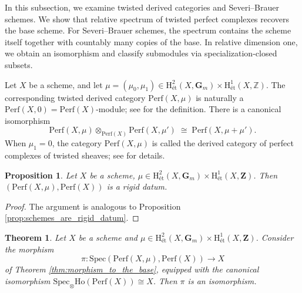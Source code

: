 \documentclass[11pt]{amsart}
\theoremstyle{definition}
\theoremstyle{plain}
\newtheorem{thm}[defn]{Theorem}
\newtheorem{prop}[defn]{Proposition}
\theoremstyle{remark}
\newcommand{\Ho}{\mathrm{Ho}}
\newcommand{\perf}{\mathrm{Perf}}
\newcommand{\Spec}{\mathrm{Spec}}
\newcommand{\oSpec}{\mathrm{Spec}_{\otimes}}
\newcommand{\etch}{\mathrm{H}_{\text{\'{e}t}}}
\numberwithin{equation}{section}
\begin{document}
In this subsection, we examine twisted derived categories and Severi--Brauer schemes. 
We show that relative spectrum of twisted perfect complexes recovers the base scheme. 
For Severi--Brauer schemes, the spectrum contains the scheme itself together with countably many copies of the base. 
In relative dimension one, we obtain an isomorphism and classify submodules via specialization-closed subsets.


Let \(X\) be a scheme, and let  
\(\mu = (\mu_0, \mu_1) \in \etch^2(X, \mathbf{G}_m) \times \etch^1(X, \mathbb{Z})\).  
The corresponding twisted derived category \(\perf(X, \mu)\) is naturally a \(\perf(X,0)=\perf(X)\)-module; see \cite{To2} for the definition.  
There is a canonical isomorphism
\[
\perf(X, \mu) \otimes_{\perf(X)} \perf(X, \mu') \;\cong\; \perf(X, \mu + \mu').
\]
When \(\mu_1=0\), the category \(\perf(X, \mu)\) is called the derived category of perfect complexes of twisted sheaves; see \cite{Ca} for details.



\begin{prop}
Let \(X\) be a scheme, \(\mu\in \etch^2(X,\mathbf{G}_m)\times \etch^1(X,\mathbf{Z})\).
Then \((\perf(X,\mu),\perf(X))\) is a rigid datum.
\end{prop}

\begin{proof}
The argument is analogous to Proposition \ref{prop:schemes_are_rigid_datum}.
\end{proof}

\begin{thm}
Let \(X\) be a scheme and \(\mu\in \etch^2(X,\mathbf{G}_m)\times \etch^1(X,\mathbf{Z})\).  
Consider the morphism
\[
\pi:\Spec(\perf(X,\mu),\perf(X))\to X
\]
of Theorem \ref{thm:morphism_to_the_base}, equipped with the canonical isomorphism 
\(\oSpec\Ho(\perf(X))\cong X\).
Then \(\pi\) is an isomorphism.
\end{thm}
\end{document}
